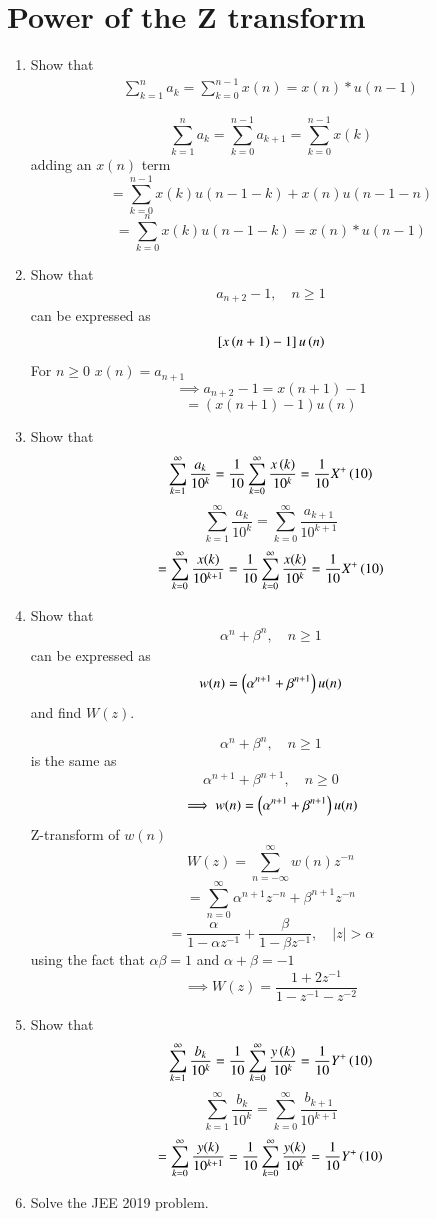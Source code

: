 \documentclass[journal,12pt,twocolumn]{IEEEtran}
\renewcommand\thesection{\arabic{section}}
\begin{document}
\section{Power of the Z transform}
\begin{enumerate}[label=\thesection.\arabic*,ref=\thesection.\theenumi]
\item Show that 
\begin{align}
	\sum_{k=1}^{n}a_k = 
	\sum_{k=0}^{n-1}x(n) = x(n)*u(n-1)
\end{align}

\solution
\[\sum_{k=1}^na_k = \sum_{k=0}^{n-1}a_{k+1} = \sum_{k=0}^{n-1}x(k)\]
adding an $x(n)$ term
\[ = \sum_{k=0}^{n-1}x(k)u(n-1-k) + x(n)u(n-1-n)\]
\[=\sum_{k=0}^{n}x(k)u(n-1-k) = x(n)*u(n-1)\]
\item Show that 
\begin{align}
a_{n+2}-1, \quad n \ge 1
\end{align}
can be expressed as 
\begin{align}
	{}\left[x\left(n+1\right)-1\right]u\left(n\right)
\end{align}
\solution
For $n\ge0$ $x(n) = a_{n+1}$
\[\implies a_{n+2} - 1 = x(n+1)-1\]
\[=(x(n+1)-1)u(n)\]
 \item Show that 
\begin{align}
	\sum_{k=1}^{\infty}\frac{a_k}{10^k}= 
	\frac{1}{10}\sum_{k=0}^{\infty}\frac{x\left(k\right)}{10^k} =\frac{1}{10}X^{+}\left({10}\right)
\end{align}
\solution
\[\sum_{k=1}^{\infty}\frac{a_k}{10^k} = \sum_{k=0}^{\infty}\frac{a_{k+1}}{10^{k+1}}\]\[ = \sum_{k=0}^{\infty}\frac{x(k)}{10^{k+1}} = \frac{1}{10}\sum_{k=0}^{\infty}\frac{x(k)}{10^{k}} = \frac{1}{10}X^{+}\left({10}\right)\]
 \item Show that 
\begin{align}
	\alpha^n + \beta^n, \quad n \ge 1
\end{align}
can be expressed as 
\begin{align}
	w(n) =\left(\alpha^{n+1} + \beta^{n+1}\right)u(n)
\end{align}
		and find $W(z)$.
  
\solution
\[\alpha^n + \beta^n, \quad n \ge 1\]
is the same as
\[\alpha^{n+1} + \beta^{n+1}, \quad n \ge 0\]
\[\implies w(n) = \left(\alpha^{n+1} + \beta^{n+1}\right)u(n)\]
Z-transform of $w(n)$
\[W(z) = \sum_{n=-\infty}^{\infty}w(n)z^{-n}\]
\[=\sum_{n=0}^{\infty}\alpha^{n+1}z^{-n} + \beta^{n+1}z^{-n}\]
\[= \frac{\alpha}{1-\alpha z^{-1}}+\frac{\beta}{1-\beta z^{-1}}, \quad |z| > \alpha\]
using the fact that $\alpha\beta = 1$ and $\alpha + \beta = -1$
\[\implies W(z) = \frac{1+2z^{-1}}{1-z^{-1}-z^{-2}}\]
 \item Show that 
\begin{align}
	\sum_{k=1}^{\infty}\frac{b_k}{10^k} =
	\frac{1}{10}\sum_{k=0}^{\infty}\frac{y\left(k\right)}{10^k} =\frac{1}{10}Y^{+}\left({10}\right)
\end{align}
\solution
\[\sum_{k=1}^{\infty}\frac{b_k}{10^k} = \sum_{k=0}^{\infty}\frac{b_{k+1}}{10^{k+1}}\]\[ = \sum_{k=0}^{\infty}\frac{y(k)}{10^{k+1}} = \frac{1}{10}\sum_{k=0}^{\infty}\frac{y(k)}{10^{k}} = \frac{1}{10}Y^{+}\left({10}\right)\]
\item Solve the JEE 2019 problem.


\end{enumerate}
\end{document}
